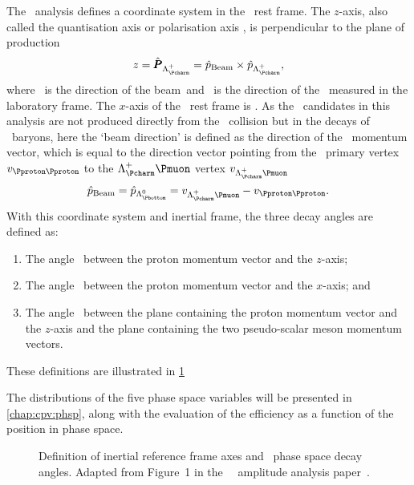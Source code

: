 The \esno\ analysis defines a coordinate system in the \PLambdac\ rest frame.
The $z$-axis, also called the quantisation axis or polarisation axis \polzlcp,
is perpendicular to the plane of production
\begin{equation}
  z = \polzlcp = \phatbeam \times \phatlcp,
\end{equation}
where \phatbeam\ is the direction of the beam\footnotemark\ and \phatlcp\ is
the direction of the \PLambdac\ measured in the laboratory frame.
The $x$-axis of the \PLambdac\ rest frame is \phatlcp.
As the \PLambdac\ candidates in this analysis are not produced directly from
the \pp\ collision but in the decays of \PLambdab\ baryons, here the `beam
direction' is defined as the direction of the \PLambdab\ momentum vector, which
is equal to the direction vector pointing from the \pp\ primary vertex
$v_{\pp}$ to the $\PLambdac\Pmuon$ vertex $v_{\PLambdac\Pmuon}$
\begin{equation}
  \phatbeam = \phatlbz = v_{\PLambdac\Pmuon} - v_{\pp}.
\end{equation}
With this coordinate system and inertial frame, the three decay angles are
defined as:
\begin{enumerate}
  \item The angle \thetap\ between the proton momentum vector and the $z$-axis;
  \item The angle \phip\ between the proton momentum vector and the $x$-axis;
    and
  \item The angle \phihh\ between the plane containing the proton momentum
    vector and the $z$-axis and the plane containing the two pseudo-scalar
    meson momentum vectors.
\end{enumerate}
These definitions are illustrated in \cref{fig:cpv:theory:phsp:angles}

The distributions of the five phase space variables will be presented in
\cref{chap:cpv:phsp}, along with the evaluation of the efficiency as a function
of the position in phase space.

\begin{figure}
  \begin{subfigure}{0.5\textwidth}
    \resizebox{\textwidth}{!}{%
      
    }
  \end{subfigure}
  \begin{subfigure}{0.5\textwidth}
    \resizebox{\textwidth}{!}{%
      
    }
  \end{subfigure}
  \caption{%
    Definition of inertial reference frame axes and \LcTophh\ phase space decay
    angles.
    Adapted from Figure~1 in the \esno\ \LcTopKpi\ amplitude analysis
    paper~\cite{Aitala:1999uq}.
  }
  \label{fig:cpv:theory:phsp:angles}
\end{figure}
